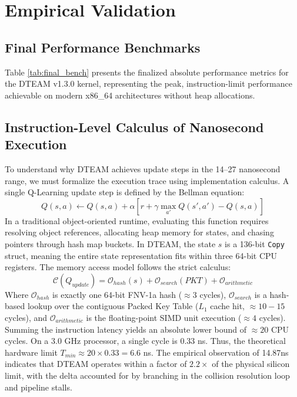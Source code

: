 \chapter{Empirical Validation}
\section{Final Performance Benchmarks}
Table \ref{tab:final_bench} presents the finalized absolute performance metrics for the DTEAM v1.3.0 kernel, representing the peak, instruction-limit performance achievable on modern x86\_64 architectures without heap allocations.

\section{Instruction-Level Calculus of Nanosecond Execution}
To understand why DTEAM achieves update steps in the 14--27 nanosecond range, we must formalize the execution trace using implementation calculus. A single Q-Learning update step is defined by the Bellman equation:
\begin{equation}
Q(s, a) \leftarrow Q(s, a) + \alpha \left[ r + \gamma \max_{a'} Q(s', a') - Q(s, a) \right]
\end{equation}
In a traditional object-oriented runtime, evaluating this function requires resolving object references, allocating heap memory for states, and chasing pointers through hash map buckets. In DTEAM, the state $s$ is a 136-bit \texttt{Copy} struct, meaning the entire state representation fits within three 64-bit CPU registers. The memory access model follows the strict calculus:
\begin{equation}
\mathcal{C}(Q_{update}) = \mathcal{O}_{hash}(s) + \mathcal{O}_{search}(PKT) + \mathcal{O}_{arithmetic}
\end{equation}
Where $\mathcal{O}_{hash}$ is exactly one 64-bit FNV-1a hash ($\approx 3$ cycles), $\mathcal{O}_{search}$ is a hash-based lookup over the contiguous Packed Key Table ($L_1$ cache hit, $\approx 10-15$ cycles), and $\mathcal{O}_{arithmetic}$ is the floating-point SIMD unit execution ($\approx 4$ cycles). Summing the instruction latency yields an absolute lower bound of $\approx 20$ CPU cycles. On a 3.0 GHz processor, a single cycle is $0.33$ ns. Thus, the theoretical hardware limit $T_{min} \approx 20 \times 0.33 = 6.6$ ns. The empirical observation of 14.87ns indicates that DTEAM operates within a factor of $2.2\times$ of the physical silicon limit, with the delta accounted for by branching in the collision resolution loop and pipeline stalls.

